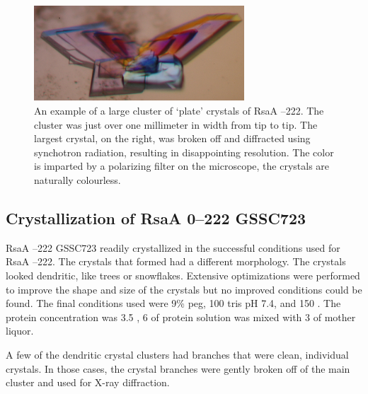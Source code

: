 \begin{figure}[htb]
  	\begin{center}
   		\includegraphics[width=0.7\textwidth]{crystal_chapter/img/bigflowerxtal.jpg}
   	\end{center}
   	\caption[Example of a large cluster of `plate' RsaA --222 crystals]{An example of a large cluster of `plate' crystals of RsaA --222. The cluster was just over one millimeter in width from tip to tip. The largest crystal, on the right, was broken off and diffracted using synchotron radiation, resulting in disappointing resolution. The color is imparted by a polarizing filter on the microscope, the crystals are naturally colourless.}
   	\label{fig:crystal-flower}
\end{figure}

\subsection{Crystallization of RsaA \del{}0--222 GSSC723} \label{sec:cryst-rsaa-del0}

RsaA --222 GSSC723 readily crystallized in the successful conditions used for RsaA --222. The crystals that formed had a different morphology. The crystals looked dendritic, like trees or snowflakes. Extensive optimizations were performed to improve the shape and size of the crystals but no improved conditions could be found. The final conditions used were 9\% \ac{peg}, 100 \millimolar{} tris pH 7.4, and 150 \millimolar{} . The protein concentration was 3.5 \mgperml{}, 6 \microlitre{} of protein solution was mixed with 3 \microlitre{} of mother liquor. 

A few of the dendritic crystal clusters had branches that were clean, individual crystals. In those cases, the crystal branches were gently broken off of the main cluster and used for X-ray diffraction.


